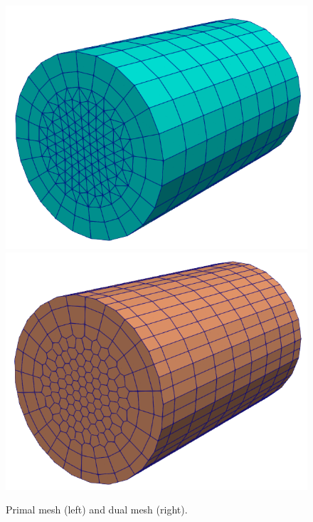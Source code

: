 \documentclass{article}
\begin{document}
\begin{figure}
    \centering
    \includegraphics[scale=0.3]{paper_version/figures/primal_mesh.png}
    \hspace{1cm}
    \includegraphics[scale=0.3]{paper_version/figures/dual_mesh.png}
    \caption{Primal mesh (left) and dual mesh (right).}
    \label{fig:primal_dual_meshes}
\end{figure}
\end{document}
